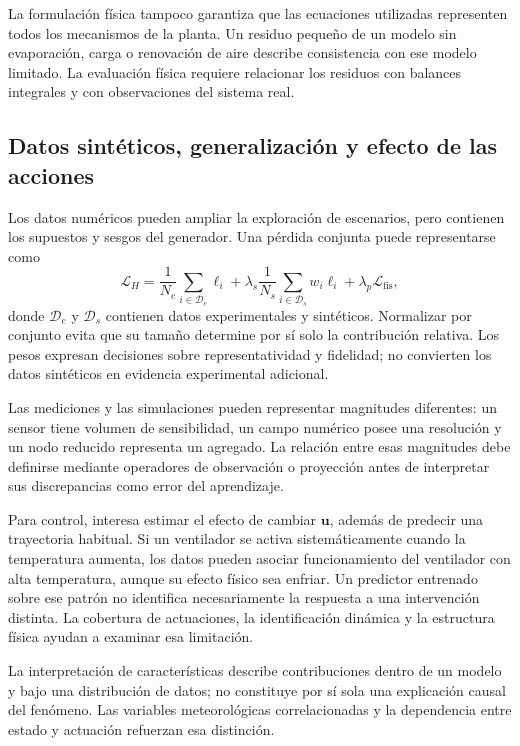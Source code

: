 La formulación física tampoco garantiza que las ecuaciones utilizadas representen todos los mecanismos de la planta. Un residuo pequeño de un modelo sin evaporación, carga o renovación de aire describe consistencia con ese modelo limitado. La evaluación física requiere relacionar los residuos con balances integrales y con observaciones del sistema real.

\subsection{Datos sintéticos, generalización y efecto de las acciones}

Los datos numéricos pueden ampliar la exploración de escenarios, pero contienen los supuestos y sesgos del generador. Una pérdida conjunta puede representarse como
\begin{equation}
\mathcal L_H=
\frac{1}{N_e}\sum_{i\in\mathcal D_e}\ell_i
+\lambda_s\frac{1}{N_s}\sum_{i\in\mathcal D_s}w_i\ell_i
+\lambda_p\mathcal L_{\mathrm{fis}},
\label{eq:perdida_datos_hibridos}
\end{equation}
donde $\mathcal D_e$ y $\mathcal D_s$ contienen datos experimentales y sintéticos. Normalizar por conjunto evita que su tamaño determine por sí solo la contribución relativa. Los pesos expresan decisiones sobre representatividad y fidelidad; no convierten los datos sintéticos en evidencia experimental adicional.

Las mediciones y las simulaciones pueden representar magnitudes diferentes: un sensor tiene volumen de sensibilidad, un campo numérico posee una resolución y un nodo reducido representa un agregado. La relación entre esas magnitudes debe definirse mediante operadores de observación o proyección antes de interpretar sus discrepancias como error del aprendizaje.

Para control, interesa estimar el efecto de cambiar $\mathbf u$, además de predecir una trayectoria habitual. Si un ventilador se activa sistemáticamente cuando la temperatura aumenta, los datos pueden asociar funcionamiento del ventilador con alta temperatura, aunque su efecto físico sea enfriar. Un predictor entrenado sobre ese patrón no identifica necesariamente la respuesta a una intervención distinta. La cobertura de actuaciones, la identificación dinámica y la estructura física ayudan a examinar esa limitación.

La interpretación de características describe contribuciones dentro de un modelo y bajo una distribución de datos; no constituye por sí sola una explicación causal del fenómeno. Las variables meteorológicas correlacionadas y la dependencia entre estado y actuación refuerzan esa distinción.

